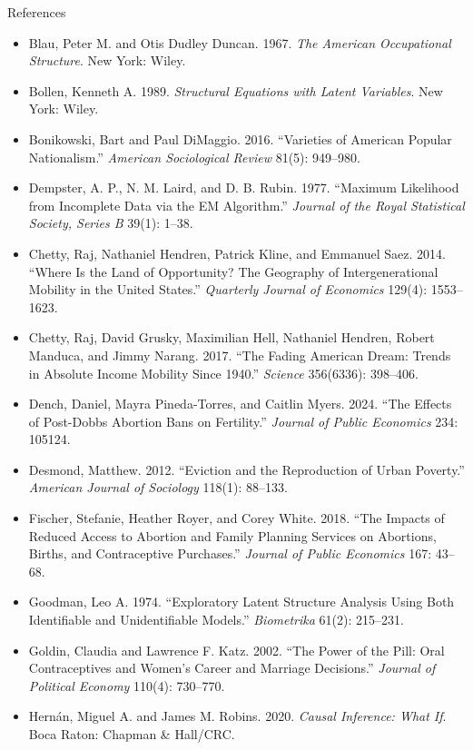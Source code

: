 \documentclass[aspectratio=169,11pt,xcolor=dvipsnames]{beamer}
\begin{document}
\begin{frame}[allowframebreaks,t]{References}
\footnotesize
\begin{itemize}\itemsep2pt
\item Blau, Peter M. and Otis Dudley Duncan. 1967. \textit{The American Occupational Structure}. New York: Wiley.
\item Bollen, Kenneth A. 1989. \textit{Structural Equations with Latent Variables}. New York: Wiley.
\item Bonikowski, Bart and Paul DiMaggio. 2016. ``Varieties of American Popular Nationalism.'' \textit{American Sociological Review} 81(5): 949--980.
\item Dempster, A. P., N. M. Laird, and D. B. Rubin. 1977. ``Maximum Likelihood from Incomplete Data via the EM Algorithm.'' \textit{Journal of the Royal Statistical Society, Series B} 39(1): 1--38.
\item Chetty, Raj, Nathaniel Hendren, Patrick Kline, and Emmanuel Saez. 2014. ``Where Is the Land of Opportunity? The Geography of Intergenerational Mobility in the United States.'' \textit{Quarterly Journal of Economics} 129(4): 1553--1623.
\item Chetty, Raj, David Grusky, Maximilian Hell, Nathaniel Hendren, Robert Manduca, and Jimmy Narang. 2017. ``The Fading American Dream: Trends in Absolute Income Mobility Since 1940.'' \textit{Science} 356(6336): 398--406.
\item Dench, Daniel, Mayra Pineda-Torres, and Caitlin Myers. 2024. ``The Effects of Post-Dobbs Abortion Bans on Fertility.'' \textit{Journal of Public Economics} 234: 105124.
\item Desmond, Matthew. 2012. ``Eviction and the Reproduction of Urban Poverty.'' \textit{American Journal of Sociology} 118(1): 88--133.
\item Fischer, Stefanie, Heather Royer, and Corey White. 2018. ``The Impacts of Reduced Access to Abortion and Family Planning Services on Abortions, Births, and Contraceptive Purchases.'' \textit{Journal of Public Economics} 167: 43--68.
\item Goodman, Leo A. 1974. ``Exploratory Latent Structure Analysis Using Both Identifiable and Unidentifiable Models.'' \textit{Biometrika} 61(2): 215--231.
\item Goldin, Claudia and Lawrence F. Katz. 2002. ``The Power of the Pill: Oral Contraceptives and Women's Career and Marriage Decisions.'' \textit{Journal of Political Economy} 110(4): 730--770.
\item Hern\'an, Miguel A. and James M. Robins. 2020. \textit{Causal Inference: What If}. Boca Raton: Chapman \& Hall/CRC.

\end{itemize}
\end{frame}
\end{document}
